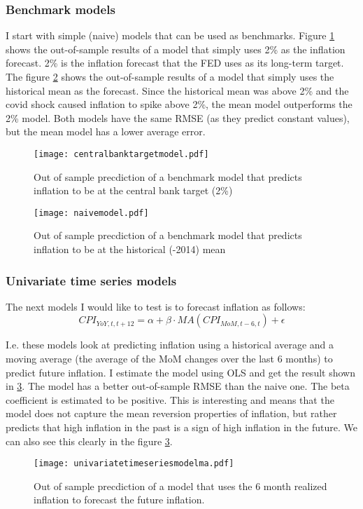 \documentclass[12pt]{article}
\begin{document}
\subsubsection{Benchmark models}
\label{sec:bmmod}
I start with simple (naive) models that can be used as benchmarks. Figure \ref{fig:cb_model} shows the out-of-sample results of a model that simply uses 2\% as the inflation forecast. 2\% is the inflation forecast that the FED uses as its long-term target.
 The figure \ref{fig:naive_model} shows the out-of-sample results of a model that simply uses the historical mean as the forecast. Since the historical mean was above 2\% and the covid shock caused inflation to spike above 2\%, the mean model outperforms the 2\% model. Both models have the same RMSE (as they predict constant values), but the mean model has a lower average error.


\begin{figure}[h]
    \centering
    \texttt{[image: centralbanktargetmodel.pdf]}
    \caption{Out of sample precdiction of a benchmark model that predicts inflation to be at the central bank target (2\%)}
    \label{fig:cb_model}
\end{figure}



\begin{figure}[h]
    \centering
    \texttt{[image: naivemodel.pdf]}
    \caption{Out of sample precdiction of a benchmark model that predicts inflation to be at the historical (-2014) mean}
    \label{fig:naive_model}
\end{figure}


\subsubsection{Univariate time series models}
\label{sec:univts}
The next models I would like to test is to forecast inflation as follows:
\begin{equation}
\label{eq:ma}
CPI_{YoY, t, t+12} = \alpha + \beta \cdot MA(CPI_{MoM,t-6,t})+\epsilon
\end{equation}

I.e. these models look at predicting inflation using a historical average and a moving average (the average of the MoM changes over the last 6 months) to predict future inflation. I estimate the model using OLS and get the result shown in \ref{fig:univariatetimeseriesmodelma}. The model has a better out-of-sample RMSE than the naive one. The beta coefficient is estimated to be positive. This is interesting and means that the model does not capture the mean reversion properties of inflation, but rather predicts that high inflation in the past is a sign of high inflation in the future. We can also see this clearly in the figure \ref{fig:univariatetimeseriesmodelma}.
\begin{figure}[h]
    \centering
    \texttt{[image: univariatetimeseriesmodelma.pdf]}
    \caption{Out of sample precdiction of a model that uses the 6 month realized inflation to forecast the future inflation.}
    \label{fig:univariatetimeseriesmodelma}
\end{figure}
\end{document}
